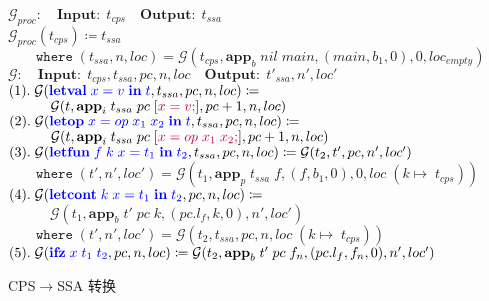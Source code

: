 \begin{figure}[!ht]
    \centering
    \begin{algorithm}[H]
        \caption{CPS$\rightarrow $SSA 转换}
        \SetAlgoLined
        $\mathcal{G}_{proc}:\quad \mathbf{Input:}\; t_{cps}\quad \mathbf{Output:}\; t_{ssa}$\\
        $\mathcal{G}_{proc}(t_{cps})\coloneqq t_{ssa}  $\\
        $\quad\quad \mathtt{where}\; (t_{ssa}, n, loc) = \mathbf{\mathcal{G}}(t_{cps}, \mathbf{app}_b\; nil\; main, (main, b_1, 0), 0, loc_{empty}) $\\
        \vspace*{0.5em}
        $ \mathbf{\mathcal{G}}:\quad \mathbf{Input:}\; t_{cps}, t_{ssa}, pc, n, loc\quad \mathbf{Output:}\; t'_{ssa}, n', loc' $ \\
        $ (1).\; \mathbf{\mathcal{G}}(\textcolor{blue}{\mathbf{letval}\; x=v\; \mathbf{in}\; t}, t_{ssa}, pc, n, loc) \coloneqq  $ \\
        $ \quad\quad\quad \mathbf{\mathcal{G}}(t, \mathbf{app}_i\; t_{ssa}\; pc\; [\textcolor{purple}{x=v;}], pc+1, n, loc) $ \\
        $ (2).\; \mathbf{\mathcal{G}}(\textcolor{blue}{\mathbf{letop}\; x=op\; x_1\; x_2\; \mathbf{in}\; t}, t_{ssa}, pc, n, loc) \coloneqq  $ \\
        $ \quad\quad\quad \mathbf{\mathcal{G}}(t, \mathbf{app}_i\; t_{ssa}\; pc\; [\textcolor{purple}{x=op\; x_1\; x_2;}], pc+1, n, loc) $ \\
        $ (3).\; \mathbf{\mathcal{G}}(\textcolor{blue}{\mathbf{letfun}\; f\; k\; x=t_1\; \mathbf{in}\; t_2}, t_{ssa}, pc, n, loc) \coloneqq \mathbf{\mathcal{G}}(t_2, t', pc, n', loc') $ \\
        $ \quad\quad \mathtt{where}\; (t', n', loc') = \mathbf{\mathcal{G}}(t_1, \mathbf{app}_p\; t_{ssa}\; f, (f, b_1, 0), 0, loc\; (k\mapsto\; t_{cps})) $ \\
        $ (4).\; \mathbf{\mathcal{G}}(\textcolor{blue}{\mathbf{letcont}\; k\; x=t_1\; \mathbf{in}\; t_2}, pc, n, loc) \coloneqq  $ \\
        $ \quad\quad\quad  \mathbf{\mathcal{G}}(t_1, \mathbf{app}_b\; t'\; pc\; k, (pc.l_f, k, 0), n', loc') $ \\
        $ \quad\quad \mathtt{where}\; (t', n', loc') = \mathbf{\mathcal{G}}(t_2, t_{ssa}, pc, n, loc\; (k\mapsto\; t_{cps})) $ \\
        $ (5).\; \mathbf{\mathcal{G}}(\textcolor{blue}{\mathbf{ifz}\; x\; t_1\; t_2}, pc, n, loc) \coloneqq \mathbf{\mathcal{G}}(t_2, \mathbf{app}_b\; t'\; pc\; f_n, (pc.l_f, f_n, 0), n', loc') $ \\

\end{algorithm}
\end{figure}
